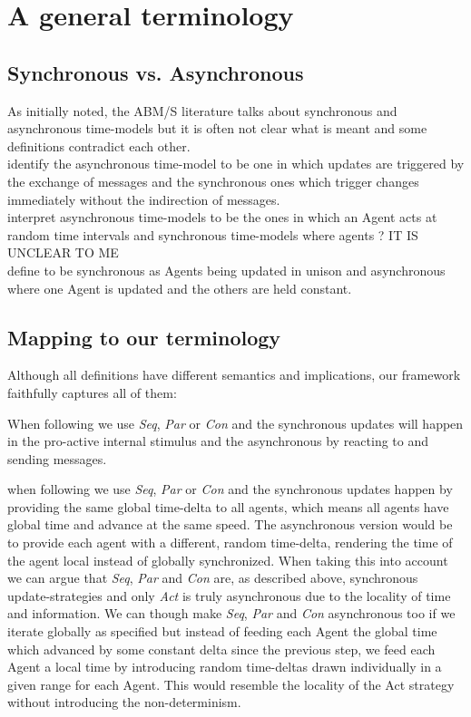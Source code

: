 \section{A general terminology}

\subsection{Synchronous vs. Asynchronous}
As initially noted, the ABM/S literature talks about synchronous and asynchronous time-models but it is often not clear what is meant and some definitions contradict each other. \\ \cite{yuxuan_agent-based_2016} identify the asynchronous time-model to be one in which updates are triggered by the exchange of messages and the synchronous ones which trigger changes immediately without the indirection of messages. \\
\cite{dawson_opening_2014} interpret asynchronous time-models to be the ones in which an Agent acts at random time intervals and synchronous time-models where agents ? IT IS UNCLEAR TO ME \\
\cite{huberman_evolutionary_1993} define to be synchronous as Agents being updated in unison and asynchronous where one Agent is updated and the others are held constant.

\subsection{Mapping to our terminology}
Although all definitions have different semantics and implications, our framework faithfully captures all of them:

When following \cite{yuxuan_agent-based_2016} we use \textit{Seq}, \textit{Par} or \textit{Con} and the synchronous updates will happen in the pro-active internal stimulus and the asynchronous by reacting to and sending messages.

when following \cite{dawson_opening_2014} we use \textit{Seq}, \textit{Par} or \textit{Con} and the synchronous updates happen by providing the same global time-delta to all agents, which means all agents have global time and advance at the same speed. The asynchronous version would be to provide each agent with a different, random time-delta, rendering the time of the agent local instead of globally synchronized. When taking this into account we can argue that \textit{Seq}, \textit{Par} and \textit{Con} are, as described above, synchronous update-strategies and only \textit{Act} is truly asynchronous due to the locality of time and information. We can though make \textit{Seq}, \textit{Par} and \textit{Con} asynchronous too if we iterate globally as specified but instead of feeding each Agent the global time which advanced by some constant delta since the previous step, we feed each Agent a local time by introducing random time-deltas drawn individually in a given range for each Agent. This would resemble the locality of the Act strategy without introducing the non-determinism.

